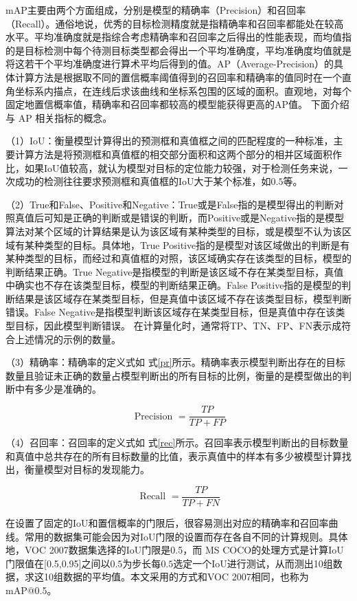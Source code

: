 mAP主要由两个方面组成，分别是模型的精确率（Precision）和召回率（Recall）。通俗地说，优秀的目标检测精度就是指精确率和召回率都能处在较高水平。平均准确度就是指综合考虑精确率和召回率之后得出的性能表现，而均值指的是目标检测中每个待测目标类型都会得出一个平均准确度，平均准确度均值就是将这若干个平均准确度进行算术平均后得到的值。AP（Average-Precision）的具体计算方法是根据取不同的置信概率阈值得到的召回率和精确率的值同时在一个直角坐标系内描点，在连线后求该曲线和坐标系包围的区域的面积。直观地，对每个固定地置信概率值，精确率和召回率都较高的模型能获得更高的AP值。
下面介绍与 AP 相关指标的概念。

（1）IoU：衡量模型计算得出的预测框和真值框之间的匹配程度的一种标准，主要计算方法是将预测框和真值框的相交部分面积和这两个部分的相并区域面积作比，如果IoU值较高，就认为模型对目标的定位能力较强，对于检测任务来说，一次成功的检测往往要求预测框和真值框的IoU大于某个标准，如$0.5$等。

（2）True和False、Positive和Negative：True或是False指的是模型得出的判断对照真值后可知是正确的判断或是错误的判断，而Positive或是Negative指的是模型算法对某个区域的计算结果是认为该区域有某种类型的目标，或是模型不认为该区域有某种类型的目标。具体地，True Positive指的是模型对该区域做出的判断是有某种类型的目标，而经过和真值框的对照，该区域确实存在该类型的目标，模型的判断结果正确。True Negative是指模型的判断是该区域不存在某类型目标，真值中确实也不存在该类型目标，模型的判断结果正确。False Positive指的是模型的判断结果是该区域存在某类型目标，但是真值中该区域不存在该类型目标，模型判断错误。False Negative是指模型判断该区域存在某类型目标，但是真值中存在该类型目标，因此模型判断错误。
在计算量化时，通常将TP、TN、FP、FN表示成符合上述情况的示例的数量。

（3）精确率：精确率的定义式如
式\ref{pr}所示。精确率表示模型判断出存在的目标数量且验证未正确的数量占模型判断出的所有目标的比例，衡量的是模型做出的判断中有多少是准确的。

\begin{equation}
     \text { Precision }=\frac{T P}{T P+F P}
    \label{pr}
\end{equation}

（4）召回率：召回率的定义式如
式\ref{rec}所示。召回率表示模型判断出的目标数量和真值中总共存在的所有目标数量的比值，表示真值中的样本有多少被模型计算找出，衡量模型对目标的发现能力。

\begin{equation}
     \text { Recall }=\frac{T P}{T P+F N}
    \label{rec}
\end{equation}

在设置了固定的IoU和置信概率的门限后，很容易测出对应的精确率和召回率曲线。常用的数据集可能会因为对IoU门限的设置而存在各自不同的计算规则。具体地，VOC 2007数据集选择的IoU门限是0.5，而 MS COCO的处理方式是计算IoU门限值在[0.5,0.95]之间以$0.5$为步长每$0.5$选定一个IoU进行测试，从而测出10组数据，求这10组数据的平均值。本文采用的方式和VOC 2007相同，也称为mAP@0.5。

